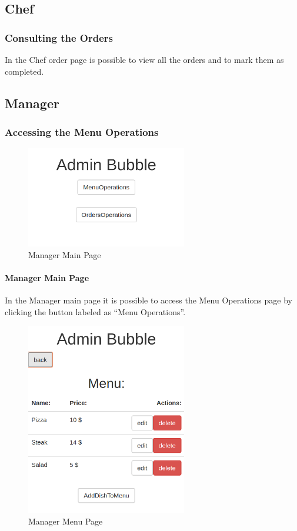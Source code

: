 \subsection{Chef}
\subsubsection{Consulting the Orders}
In the Chef order page is possible to view all the orders and to mark them as completed.

\subsection{Manager}
\subsubsection{Accessing the Menu Operations}
\begin{figure}[H]
	\centering
	\includegraphics[width=7cm]{../../documenti/UserManualDemo/demo_screens/admin_main.png}
	\caption{Manager Main Page}
\end{figure}
\paragraph{Manager Main Page}
In the Manager main page it is possible to access the Menu Operations page by clicking the button labeled as ``Menu Operations''.

\begin{figure}[H]
	\centering
	\includegraphics[width=7cm]{../../documenti/UserManualDemo/demo_screens/admin_menu.png}
	\caption{Manager Menu Page}
\end{figure}
